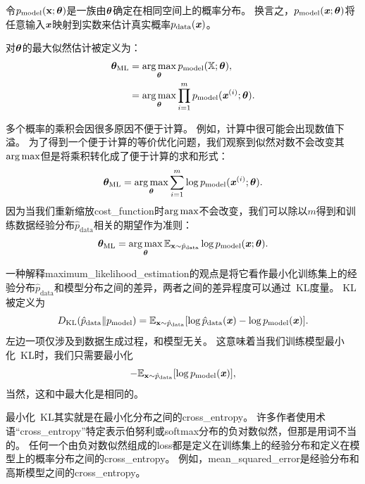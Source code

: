 令$p_{\text{model}}( \mathbf{x}; \boldsymbol{\theta} )$是一族由$\boldsymbol{\theta}$确定在相同空间上的概率分布。
换言之，$p_{\text{model}}(\boldsymbol{\mathit{x}};\boldsymbol{\theta})$将任意输入$\boldsymbol{\mathit{x}}$映射到实数来估计真实概率$p_{\text{data}}(\boldsymbol{\mathit{x}})$。

对$\boldsymbol{\theta}$的最大似然估计被定义为：
\begin{align}
    \boldsymbol{\theta}_{\text{ML}} &= \underset{\boldsymbol{\theta}}{\arg\max} \, p_{\text{model}} (\mathbb{X}; \boldsymbol{\theta}), \\
        &= \underset{\boldsymbol{\theta}}{\arg\max} \prod_{i=1}^m p_{\text{model}} (\boldsymbol{\mathit{x}}^{(i)}; \boldsymbol{\theta}).
\end{align}

多个概率的乘积会因很多原因不便于计算。
例如，计算中很可能会出现数值下溢。
为了得到一个便于计算的等价优化问题，我们观察到似然对数不会改变其$\arg\max$但是将乘积转化成了便于计算的求和形式：
\begin{equation}
    \boldsymbol{\theta}_{\text{ML}} = \underset{\boldsymbol{\theta}}{\arg\max} \sum_{i=1}^m \log p_{\text{model}} (\boldsymbol{\mathit{x}}^{(i)}; \boldsymbol{\theta}) .
\end{equation}
因为当我们重新缩放\gls{cost_function}时$\arg\max$不会改变，我们可以除以$m$得到和训练数据经验分布$\hat{p}_{\text{data}}$相关的期望作为准则：
\begin{equation}
\label{eq:5.59}
    \boldsymbol{\theta}_{\text{ML}} = \underset{\boldsymbol{\theta}}{\arg\max} \,\mathbb{E}_{\mathbf{x} \sim \hat{p}_{\text{data}}} \log p_{\text{model}} (\boldsymbol{\mathit{x}}; \boldsymbol{\theta}) .
\end{equation}

一种解释\gls{maximum_likelihood_estimation}的观点是将它看作最小化训练集上的经验分布$\hat{p}_{\text{data}}$和模型分布之间的差异，两者之间的差异程度可以通过~\gls{KL}度量。
\gls{KL}被定义为
\begin{equation}
    D_{\text{KL}}(\hat{p}_{\text{data}} \| p_{\text{model}}) = \mathbb{E}_{\mathbf{x} \sim \hat{p}_{\text{data}}} [ \log \hat{p}_{\text{data}}(\boldsymbol{\mathit{x}}) - \log p_{\text{model}}(\boldsymbol{\mathit{x}}) ] .
\end{equation}
左边一项仅涉及到数据生成过程，和模型无关。
这意味着当我们训练模型最小化~\gls{KL}时，我们只需要最小化
\begin{equation}
    -\mathbb{E}_{\mathbf{x} \sim \hat{p}_{\text{data}}} [ \log p_{\text{model}}(\boldsymbol{\mathit{x}})  ] ,
\end{equation}
当然，这和中最大化是相同的。


最小化~\gls{KL}其实就是在最小化分布之间的\gls{cross_entropy}。
许多作者使用术语``\gls{cross_entropy}''特定表示伯努利或softmax分布的负对数似然，但那是用词不当的。
任何一个由负对数似然组成的\gls{loss}都是定义在训练集上的经验分布和定义在模型上的概率分布之间的\gls{cross_entropy}。
例如，\gls{mean_squared_error}是经验分布和高斯模型之间的\gls{cross_entropy}。

